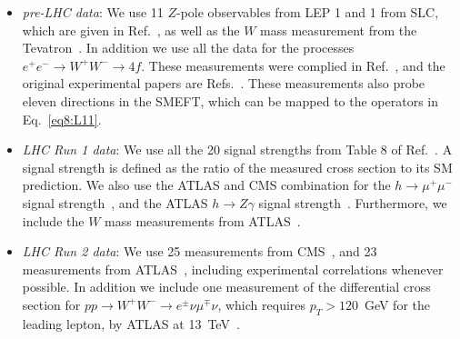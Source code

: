 \documentclass[../report.tex]{subfiles}
\begin{document}
\begin{itemize}
\item \textit{pre-LHC data}:  
We use 11 $Z$-pole observables from LEP 1 and 1 from SLC, which are given in Ref.~\cite{ALEPH:2005ab}, as well as the $W$ mass measurement from the Tevatron~\cite{Aaltonen:2013iut}.
In addition we use all the data for the processes $e^+ e^- \to W^+ W^- \to 4f$. 
These measurements were complied in Ref.~\cite{Berthier:2016tkq}, and the original experimental papers are Refs.~\cite{Heister:2004wr, Achard:2004zw, Abbiendi:2007rs, Schael:2013ita}. 
These measurements also probe eleven directions in the SMEFT, which can be mapped to the operators in Eq.~\eqref{eq8:L11}.

\item \textit{LHC Run 1 data}: 
We use all the 20 signal strengths from Table 8 of Ref.~\cite{Khachatryan:2016vau}.
A signal strength is defined as the ratio of the measured cross section to its SM prediction. 
We also use the ATLAS and CMS combination for the $h \to \mu^+ \mu^-$ signal strength~\cite{Khachatryan:2016vau}, and the ATLAS $h \to Z \gamma$ signal strength~\cite{Aad:2015gba}. 
Furthermore, we include the $W$ mass measurements from ATLAS~\cite{Aaboud:2017svj}.

\item \textit{LHC Run 2 data}: 
We use 25 measurements from CMS~\cite{Sirunyan:2017dgc, Sirunyan:2017elk, Sirunyan:2018mvw, Sirunyan:2018shy, CMS-PAS-HIG-16-042, Sirunyan:2018ouh, Sirunyan:2017exp, Sirunyan:2017khh}, and 23 measurements from ATLAS~\cite{Aaboud:2017ojs, Aaboud:2017xsd, Aaboud:2017rss, Aaboud:2017jvq, ATLAS-CONF-2018-004, ATLAS-CONF-2017-047, ATLAS-CONF-2016-112}, including experimental correlations whenever possible. 
In addition we include one measurement of the differential cross section for $p p \to W^+ W^- \to e^{\pm} \nu \mu^{\mp} \nu$, which requires $p_T > 120$~GeV for the leading lepton, by ATLAS at 13~TeV~\cite{Aaboud:2017qkn}.
\end{itemize}
\end{document}

